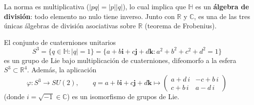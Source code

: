 La norma es multiplicativa ($|pq| = |p||q|$), lo cual implica que $\mathbb{H}$ es un \textbf{álgebra de división}: todo elemento no nulo tiene inverso. Junto con $\mathbb{R}$ y $\mathbb{C}$, es una de las tres únicas álgebras de división asociativas sobre $\mathbb{R}$ (teorema de Frobenius).

\begin{proposition}\label{prop:cuaterniones_su2}
El conjunto de cuaterniones unitarios
\[
S^3 = \{q \in \mathbb{H} : |q| = 1\} = \{a + b\mathbf{i} + c\mathbf{j} + d\mathbf{k} : a^2 + b^2 + c^2 + d^2 = 1\}
\]
es un grupo de Lie bajo multiplicación de cuaterniones, difeomorfo a la esfera $S^3 \subset \mathbb{R}^4$. Además, la aplicación
\begin{equation}\label{eq:iso_cuaterniones_su2}
\varphi: S^3 \longrightarrow SU(2), \qquad q = a + b\mathbf{i} + c\mathbf{j} + d\mathbf{k} \longmapsto \begin{pmatrix} a + d\,i & -c + b\,i \\ c + b\,i & a - d\,i \end{pmatrix}
\end{equation}
(donde $i = \sqrt{-1} \in \mathbb{C}$) es un isomorfismo de grupos de Lie.
\end{proposition}

